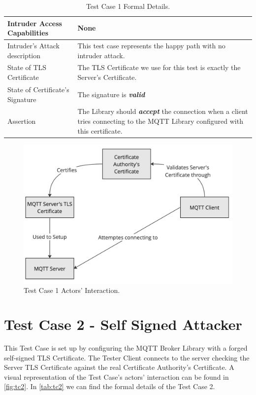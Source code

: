 \documentclass[binding=0.6cm,noexaminfo]{sapthesis}
\begin{document}
\begin{table}
\begin{center}
\begin{tabular}{| p{6cm} | p{6cm} |}
\hline
Intruder Access Capabilities & None \\
\hline
Intruder’s Attack description & This test case represents the happy path with no intruder attack. \\
\hline
State of TLS Certificate & The TLS Certificate we use for this test is exactly the Server’s Certificate. \\
\hline
State of Certificate’s Signature & The signature is \textbf{\textit{valid}} \\
\hline
Assertion & The Library should \textbf{\textit{accept}} the connection when a client tries connecting to the MQTT Library configured with this certificate. \\
\hline
\end{tabular}
\caption{Test Case 1 Formal Details.}
\label{tab:tc1}
\end{center}
\end{table}

\begin{figure}[htb]
	\includegraphics[width=14cm]{TC1}
	\caption{Test Case 1 Actors' Interaction.}
	\label{fig:tc1}
\end{figure}

\section{Test Case 2 - Self Signed Attacker}
This Test Case is set up by configuring the MQTT Broker Library with a forged self-signed TLS Certificate. The Tester Client connects to the server checking the Server TLS Certificate against the real Certificate Authority’s Certificate. A visual representation of the Test Case's actors' interaction can be found in \autoref{fig:tc2}.  In \autoref{tab:tc2} we can find the formal details of the Test Case 2.
\end{document}
